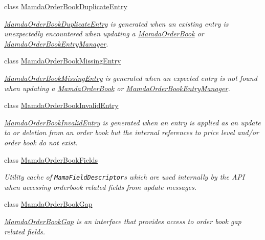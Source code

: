 \begin{CompactItemize}
class \hyperlink{classWombat_1_1MamdaOrderBookDuplicateEntry}{Mamda\-Order\-Book\-Duplicate\-Entry}
\begin{CompactList}\small\item\em \hyperlink{classWombat_1_1MamdaOrderBookDuplicateEntry}{Mamda\-Order\-Book\-Duplicate\-Entry} is generated when an existing entry is unexpectedly encountered when updating a \hyperlink{classWombat_1_1MamdaOrderBook}{Mamda\-Order\-Book} or \hyperlink{classWombat_1_1MamdaOrderBookEntryManager}{Mamda\-Order\-Book\-Entry\-Manager}. \item\end{CompactList}\item 
class \hyperlink{classWombat_1_1MamdaOrderBookMissingEntry}{Mamda\-Order\-Book\-Missing\-Entry}
\begin{CompactList}\small\item\em \hyperlink{classWombat_1_1MamdaOrderBookMissingEntry}{Mamda\-Order\-Book\-Missing\-Entry} is generated when an expected entry is not found when updating a \hyperlink{classWombat_1_1MamdaOrderBook}{Mamda\-Order\-Book} or \hyperlink{classWombat_1_1MamdaOrderBookEntryManager}{Mamda\-Order\-Book\-Entry\-Manager}. \item\end{CompactList}\item 
class \hyperlink{classWombat_1_1MamdaOrderBookInvalidEntry}{Mamda\-Order\-Book\-Invalid\-Entry}
\begin{CompactList}\small\item\em \hyperlink{classWombat_1_1MamdaOrderBookInvalidEntry}{Mamda\-Order\-Book\-Invalid\-Entry} is generated when an entry is applied as an update to or deletion from an order book but the internal references to price level and/or order book do not exist. \item\end{CompactList}\item 
class \hyperlink{classWombat_1_1MamdaOrderBookFields}{Mamda\-Order\-Book\-Fields}
\begin{CompactList}\small\item\em Utility cache of {\tt Mama\-Field\-Descriptor}s which are used internally by the API when accessing orderbook related fields from update messages. \item\end{CompactList}\item 
class \hyperlink{classWombat_1_1MamdaOrderBookGap}{Mamda\-Order\-Book\-Gap}
\begin{CompactList}\small\item\em \hyperlink{classWombat_1_1MamdaOrderBookGap}{Mamda\-Order\-Book\-Gap} is an interface that provides access to order book gap related fields. \item\end{CompactList}\item 

\end{CompactItemize}
